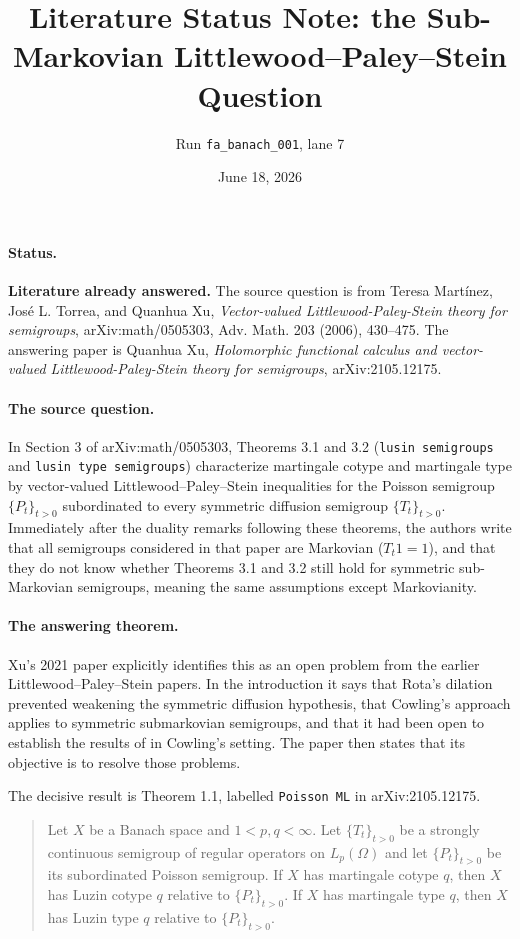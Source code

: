 \documentclass[11pt]{article}
\title{Literature Status Note: the Sub-Markovian Littlewood--Paley--Stein Question}
\author{Run \texttt{fa\_banach\_001}, lane 7}
\date{June 18, 2026}
\newcommand{\Pt}{P}
\newcommand{\Tt}{T}
\begin{document}
\sloppy
\maketitle

\paragraph{Status.}
\textbf{Literature already answered.}
The source question is from Teresa Mart\'inez, Jos\'e L. Torrea, and Quanhua Xu,
\emph{Vector-valued Littlewood-Paley-Stein theory for semigroups},
arXiv:math/0505303, Adv. Math. 203 (2006), 430--475.
The answering paper is Quanhua Xu,
\emph{Holomorphic functional calculus and vector-valued Littlewood-Paley-Stein
theory for semigroups}, arXiv:2105.12175.

\paragraph{The source question.}
In Section 3 of arXiv:math/0505303, Theorems 3.1 and 3.2
(\texttt{lusin semigroups} and \texttt{lusin type semigroups}) characterize
martingale cotype and martingale type by vector-valued
Littlewood--Paley--Stein inequalities for the Poisson semigroup
$\{\Pt_t\}_{t>0}$ subordinated to every symmetric diffusion semigroup
$\{\Tt_t\}_{t>0}$.
Immediately after the duality remarks following these theorems, the authors
write that all semigroups considered in that paper are Markovian
($\Tt_t1=1$), and that they do not know whether Theorems 3.1 and 3.2 still
hold for symmetric sub-Markovian semigroups, meaning the same assumptions
except Markovianity.

\paragraph{The answering theorem.}
Xu's 2021 paper explicitly identifies this as an open problem from the
earlier Littlewood--Paley--Stein papers. In the introduction it says that
Rota's dilation prevented weakening the symmetric diffusion hypothesis, that
Cowling's approach applies to symmetric submarkovian semigroups, and that it
had been open to establish the results of \cite{MTX2006} in Cowling's setting.
The paper then states that its objective is to resolve those problems.

The decisive result is Theorem 1.1, labelled \texttt{Poisson ML} in
arXiv:2105.12175.

\begin{quote}
Let $X$ be a Banach space and $1<p,q<\infty$. Let
$\{\Tt_t\}_{t>0}$ be a strongly continuous semigroup of regular operators on
$L_p(\Omega)$ and let $\{\Pt_t\}_{t>0}$ be its subordinated Poisson semigroup.
If $X$ has martingale cotype $q$, then $X$ has Luzin cotype $q$ relative to
$\{\Pt_t\}_{t>0}$. If $X$ has martingale type $q$, then $X$ has Luzin type
$q$ relative to $\{\Pt_t\}_{t>0}$.
\end{quote}
\end{document}
